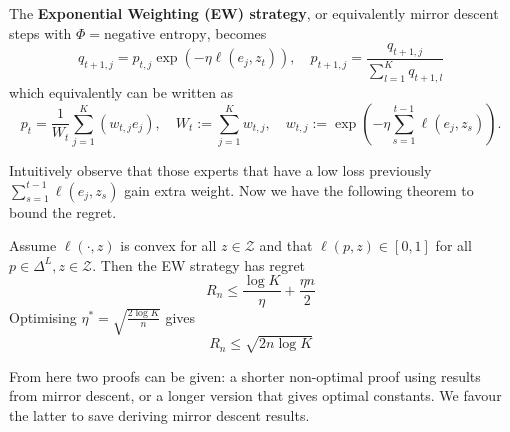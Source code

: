 The \textbf{Exponential Weighting (EW) strategy}, or equivalently mirror descent steps with $\Phi = \text{negative entropy}$, becomes
$$
	q_{t+1,j} = p_{t,j} \exp( -\eta \ell(e_j,z_t)), \quad
	p_{t+1,j} = \frac{q_{t+1,j} }{\sum_{l=1}^K q_{t+1,l} }
$$
which equivalently can be written as
$$
	p_t = \frac{1}{W_{t}} \sum_{j=1}^K \left(
	w_{t,j} e_j
	\right), \quad
	W_{t}:= \sum_{j=1}^K w_{t,j},
	 \quad
	w_{t,j}:= \exp \left(
	- \eta \sum_{s=1}^{t-1} \ell( e_j,z_s)
	\right).
$$

Intuitively observe that those experts that have a low loss previously $\sum_{s=1}^{t-1} \ell( e_j,z_s)$ gain extra weight. Now we have the following theorem to bound the regret.

\begin{theorem}
Assume $\ell(\cdot,z)$ is convex for all $z \in \mathcal{Z}$ and that $\ell(p,z) \in [0,1]$ for all $p \in \Delta^L, z \in \mathcal{Z}$. Then the EW strategy has regret
$$
	R_n \leq \frac{\log K}{\eta} + \frac{\eta n}{2}
$$
Optimising $\eta^* = \sqrt{\frac{2 \log K}{n}}$ gives
$$
	R_n \leq \sqrt{ 2n \log K}
$$
\end{theorem}

From here two proofs can be given: a shorter non-optimal proof using results from mirror descent, or a longer version that gives optimal constants. We favour the latter to save deriving mirror descent results.

